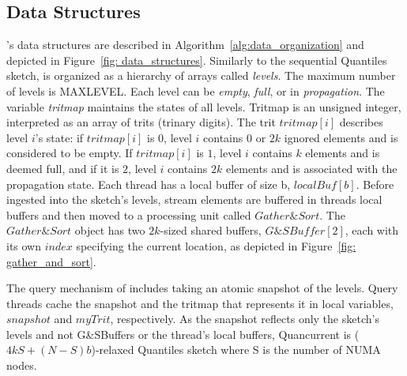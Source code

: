 \subsection{Data Structures}

\mysketch's data structures are described in Algorithm~\ref{alg:data_organization} and depicted in Figure~\ref{fig: data_structures}.
Similarly to the sequential Quantiles sketch, \mysketch is organized as a hierarchy of arrays called \emph{levels}. The maximum number of levels is \gls{MAXLEVEL}. Each level can be \emph{empty}, \emph{full}, or in \emph{propagation}. The variable \emph{tritmap} maintains the states of all levels. Tritmap is an unsigned integer, interpreted as an array of trits (trinary digits). The trit $tritmap[i]$ describes level $i$'s state: if $tritmap[i]$ is $0$, level $i$ contains $0$ or $2k$ ignored elements and is considered to be empty. If $tritmap[i]$ is $1$, level $i$ contains $k$ elements and is deemed full, and if it is $2$, level $i$ contains $2k$ elements and is associated with the propagation state. Each thread has a local buffer of size \gls{b}, $\mathit{localBuf[b]}$. Before ingested into the sketch's levels, stream elements are buffered in threads local buffers and then moved to a processing unit called $\mathit{Gather\&Sort}$. The $\mathit{Gather\&Sort}$ object has two $2k$-sized shared buffers, $\mathit{G\&SBuffer}[2]$, each with its own $\mathit{index}$ specifying the current location, as depicted in Figure~\ref{fig: gather_and_sort}. 

The query mechanism of \mysketch includes taking an atomic snapshot of the levels. Query threads cache the snapshot and the tritmap that represents it in local variables, 
$\mathit{snapshot}$ and $\mathit{myTrit}$, respectively. As the snapshot reflects only the sketch's levels and not G\&SBuffers or the thread's local buffers, Quancurrent is ($4kS+(N-S)b$)-relaxed Quantiles sketch where \gls{S} is the number of NUMA nodes. 


